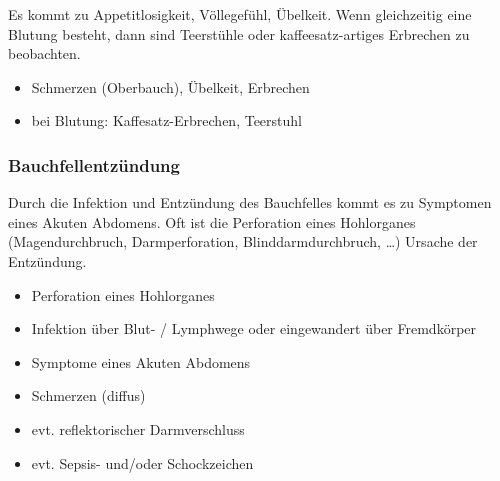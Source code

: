 {
Es kommt zu Appetitlosigkeit, Völlegefühl, Übelkeit. Wenn
gleichzeitig eine Blutung besteht, dann sind Teerstühle
oder kaffeesatz-artiges Erbrechen zu beobachten.
}
{
\begin{itemize}
    \item Schmerzen (Oberbauch), Übelkeit, Erbrechen
    \item bei Blutung: Kaffesatz-Erbrechen,  Teerstuhl
\end{itemize}
}{}{}{}









\subsubsection{Bauchfellentzündung}



\Married
{Durch die Infektion und Entzündung des Bauchfelles kommt es
zu Symptomen eines Akuten Abdomens. Oft ist die Perforation
eines Hohlorganes  (Magendurchbruch, Darmperforation,
Blinddarmdurchbruch, \ldots) Ursache der Entzündung. }
{

\begin{itemize}
    \item Perforation eines Hohlorganes
    \item Infektion über Blut- / Lymphwege oder eingewandert
    über Fremdkörper
\end{itemize}

\SlideHeading{\TxSymptome}

\begin{itemize}
    \item Symptome eines Akuten Abdomens
    \item Schmerzen (diffus)
    \item evt. reflektorischer Darmverschluss
    \item evt. Sepsis- und/oder Schockzeichen
\end{itemize}}


% 



